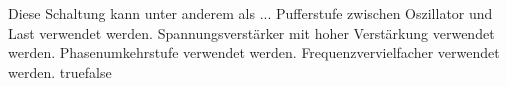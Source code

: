     {Diese Schaltung kann unter anderem als ...}
    {Pufferstufe zwischen Oszillator und Last verwendet werden.}
    {Spannungsverstärker mit hoher Verstärkung verwendet werden.}
    {Phasenumkehrstufe verwendet werden.}
    {Frequenzvervielfacher verwendet werden.}
    {true}{false}